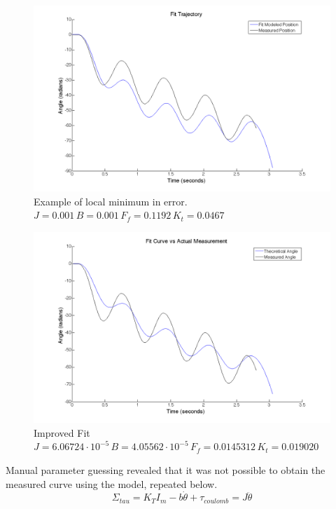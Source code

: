 \documentclass{article}
\theoremstyle{plain}
\theoremstyle{definition}
\theoremstyle{remark}
\begin{document}
\begin{figure}[htb]
\begin{center}
\includegraphics[width = 14cm]{fitModel.png}
\caption{Example of local minimum in error.  $J = 0.001 \, B = 0.001 \, F_{f} = 0.1192 \, K_{t} = 0.0467 $}
\label{q2_b6}
\end{center}
\end{figure}

\begin{figure}[htb]
\begin{center}
\includegraphics[width = 14cm]{2ndexamplefit.png}
\caption{Improved Fit $J = 6.06724 \cdot 10^{-5} \, B = 4.05562 \cdot 10^{-5} \, F_{f} = 0.0145312 \, K_{t} = 0.019020 $}
\label{q2_b7}
\end{center}
\end{figure}

Manual parameter guessing revealed that it was not possible to obtain the measured curve using the model, repeated below. 
$$ \Sigma_{tau} = K_{T}I_{m} - b\dot{\theta} + \tau_{coulomb} = J \ddot{\theta} $$
\end{document}
